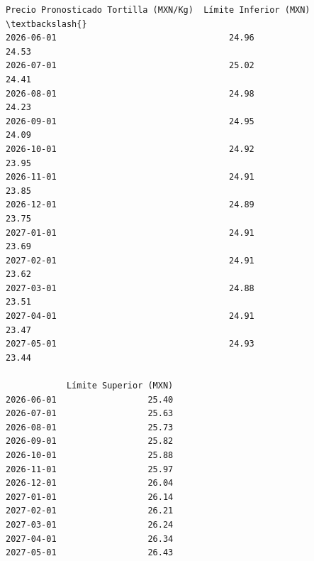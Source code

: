 \documentclass[11pt]{article}
\makeatletter
\newcommand{\boxspacing}{\kern\kvtcb@left@rule\kern\kvtcb@boxsep}
\newcommand{\prompt}[4]{
        {\ttfamily\llap{{\color{#2}[#3]:\hspace{3pt}#4}}\vspace{-\baselineskip}}
    }
\makeatother
\begin{document}
            \begin{tcolorbox}[breakable, size=fbox, boxrule=.5pt, pad at break*=1mm, opacityfill=0]
\prompt{Out}{outcolor}{279}{\boxspacing}
\begin{Verbatim}[commandchars=\\\{\}]
            Precio Pronosticado Tortilla (MXN/Kg)  Límite Inferior (MXN)  \textbackslash{}
2026-06-01                                  24.96                  24.53
2026-07-01                                  25.02                  24.41
2026-08-01                                  24.98                  24.23
2026-09-01                                  24.95                  24.09
2026-10-01                                  24.92                  23.95
2026-11-01                                  24.91                  23.85
2026-12-01                                  24.89                  23.75
2027-01-01                                  24.91                  23.69
2027-02-01                                  24.91                  23.62
2027-03-01                                  24.88                  23.51
2027-04-01                                  24.91                  23.47
2027-05-01                                  24.93                  23.44

            Límite Superior (MXN)
2026-06-01                  25.40
2026-07-01                  25.63
2026-08-01                  25.73
2026-09-01                  25.82
2026-10-01                  25.88
2026-11-01                  25.97
2026-12-01                  26.04
2027-01-01                  26.14
2027-02-01                  26.21
2027-03-01                  26.24
2027-04-01                  26.34
2027-05-01                  26.43
\end{Verbatim}
\end{tcolorbox}
        
\end{document}
